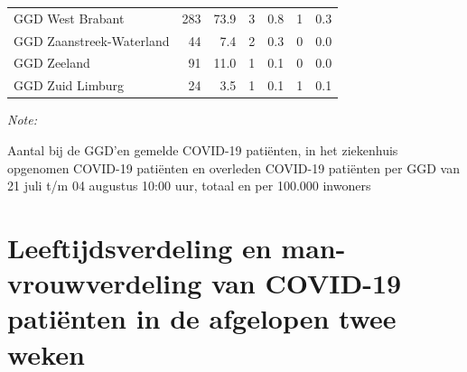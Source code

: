 \documentclass[
  english,
  man,floatsintext]{apa6}
\begin{document}
\begin{table}[H]
\begin{threeparttable}
\begin{tabular}{lrrrrrr}
GGD West Brabant & 283 & 73.9 & 3 & 0.8 & 1 & 0.3\\
GGD Zaanstreek-Waterland & 44 & 7.4 & 2 & 0.3 & 0 & 0.0\\
GGD Zeeland & 91 & 11.0 & 1 & 0.1 & 0 & 0.0\\
GGD Zuid Limburg & 24 & 3.5 & 1 & 0.1 & 1 & 0.1\\
\bottomrule
\end{tabular}
\begin{tablenotes}
\item \textit{Note: } 
\item Aantal bij de GGD’en gemelde COVID-19 patiënten, in het ziekenhuis opgenomen COVID-19 patiënten en overleden COVID-19 patiënten per GGD van 21 juli t/m 04 augustus 10:00 uur, totaal en per 100.000 inwoners
\end{tablenotes}
\end{threeparttable}
\endgroup{}
\end{table}

\newpage

\hypertarget{leeftijdsverdeling-en-man-vrouwverdeling-van-covid-19-patiuxebnten-in-de-afgelopen-twee-weken}{%
\section{Leeftijdsverdeling en man-vrouwverdeling van COVID-19 patiënten in de afgelopen twee weken}\label{leeftijdsverdeling-en-man-vrouwverdeling-van-covid-19-patiuxebnten-in-de-afgelopen-twee-weken}}
\end{document}
